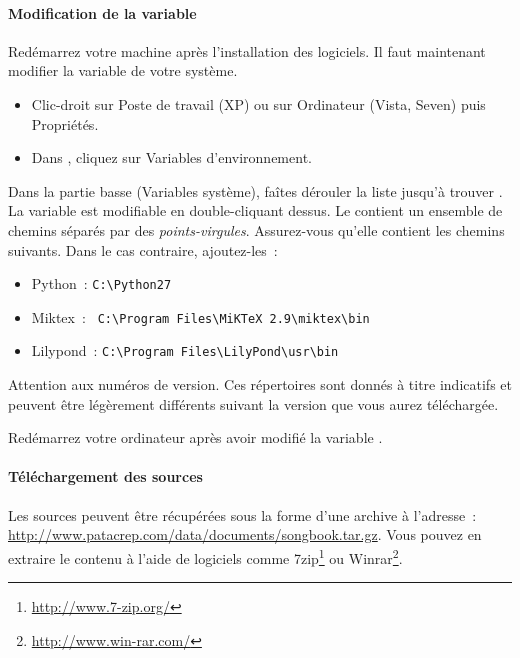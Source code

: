 \paragraph{Modification de la variable }

Redémarrez votre machine après l'installation des logiciels. 
Il faut maintenant modifier la variable  de votre
système.
\begin{itemize}
\item Clic-droit sur Poste de travail (XP) ou sur Ordinateur (Vista,
  Seven) puis Propriétés.
\item Dans , cliquez sur Variables
  d'environnement.
\end{itemize}

Dans la partie basse (Variables système), faîtes dérouler la liste
jusqu'à trouver . La variable est modifiable en
double-cliquant dessus. Le  contient un ensemble de
chemins séparés par des \emph{points-virgules}. Assurez-vous qu'elle
contient les chemins suivants. Dans le cas contraire, ajoutez-les~:
\begin{itemize}
\item Python~: \verb#C:\Python27#
\item Miktex~: \verb# C:\Program Files\MiKTeX 2.9\miktex\bin#
\item Lilypond~: \verb#C:\Program Files\LilyPond\usr\bin#
\end{itemize}                     

\begin{nota}
Attention aux numéros de version. Ces répertoires sont donnés à titre
indicatifs et peuvent être légèrement différents suivant la version
que vous aurez téléchargée.
\end{nota}

Redémarrez votre ordinateur après avoir modifié la variable
.


\paragraph{Téléchargement des sources}

Les sources peuvent être récupérées sous la forme d'une archive
 à l'adresse~:
\url{http://www.patacrep.com/data/documents/songbook.tar.gz}. Vous
pouvez en extraire le contenu à l'aide de logiciels comme
7zip\footnote{\url{http://www.7-zip.org/}} ou
Winrar\footnote{\url{http://www.win-rar.com/}}.

